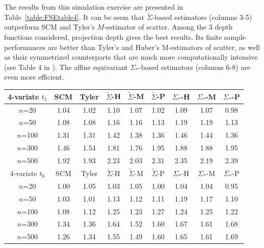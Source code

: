 The results from this simulation exercise are presented in Table~\ref{table:FSEtable4}.
It can be seem that  $\tilde{\Sigma}$-based estimators (columns 3-5) 
outperform SCM and Tyler's $M$-estimator of scatter. Among the 3 depth functions 
considered, projection depth gives the best results. Its finite sample performances are 
better than Tyler's and Huber's M-estimators of scatter, as well as their symmetrized 
counterparts that are much more computationally intensive (see Table 4 in 
\cite{ref:JMVA071611_Sirkiaetal}). The affine equivariant ${\Sigma}_{*}$-based estimators
 (columns 6-8) are even more efficient.

\begin{table}[t]
\begin{scriptsize}
    \begin{tabular}{c|cc|ccc|ccc}
    \hline
    4-variate $t_5$    & SCM  & Tyler & $\tilde{\Sigma}$-H & $\tilde{\Sigma}$-M & $\tilde{\Sigma}$-P & ${\Sigma}_{*}$-H & ${\Sigma}_{*}$-M & ${\Sigma}_{*}$-P \\ \hline
    $n$=20             & 1.04 & 1.02  & 1.10   & 1.07   & 1.02  & 1.09    & 1.07    & 0.98   \\
    $n$=50             & 1.08 & 1.08  & 1.16   & 1.16   & 1.13  & 1.19    & 1.19    & 1.13   \\
    $n$=100            & 1.31 & 1.31  & 1.42   & 1.38   & 1.36  & 1.46    & 1.44    & 1.36   \\
    $n$=300            & 1.46 & 1.54  & 1.81   & 1.76   & 1.95  & 1.88    & 1.88    & 1.95   \\
    $n$=500            & 1.92 & 1.93  & 2.23   & 2.03   & 2.31  & 2.35    & 2.19    & 2.39   \\ \hline
    4-variate $t_6$     & SCM  & Tyler & $\tilde{\Sigma}$-H & $\tilde{\Sigma}$-M & $\tilde{\Sigma}$-P & ${\Sigma}_{*}$-H & ${\Sigma}_{*}$-M & ${\Sigma}_{*}$-P \\ \hline
    $n$=20             & 1.00 & 1.05  & 1.03   & 1.05   & 1.00  & 1.04    & 1.04    & 0.95   \\
    $n$=50             & 1.03 & 1.01  & 1.13   & 1.12   & 1.11  & 1.19    & 1.17    & 1.10   \\
    $n$=100            & 1.08 & 1.12  & 1.25   & 1.23   & 1.27  & 1.24    & 1.25    & 1.22   \\
    $n$=300            & 1.34 & 1.36  & 1.64   & 1.52   & 1.60  & 1.67    & 1.61    & 1.68   \\
    $n$=500            & 1.26 & 1.34  & 1.55   & 1.49   & 1.60  & 1.65    & 1.61    & 1.69   \\ \hline

\end{tabular}
\end{scriptsize}
\end{table}
